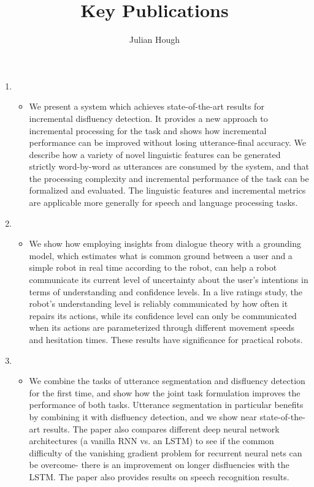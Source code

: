 \documentclass[12pt]{article}
\title{Key Publications}
\author{Julian Hough}
\begin{document}
\maketitle


\begin{enumerate}
\item{}
\begin{itemize}
\item[] We present a system which achieves state-of-the-art results for incremental disfluency detection. It provides a new approach to incremental processing for the task and shows how incremental performance can be improved without losing utterance-final accuracy. We describe how a variety of novel linguistic features can be generated strictly word-by-word as utterances are consumed by the system, and that the processing complexity and incremental performance of the task can be formalized and evaluated. The linguistic features and incremental metrics are applicable more generally for speech and language processing tasks.
\end{itemize}

\item{}\begin{itemize}
\item[] We show how employing insights from dialogue theory with a grounding model, which estimates what is common ground between a user and a simple robot in real time according to the robot, can help a robot communicate its current level of uncertainty about the user's intentions in terms of understanding and confidence levels. In a live ratings study, the robot's understanding level is reliably communicated by how often it repairs its actions, while its confidence level can only be communicated when its actions are parameterized through different movement speeds and hesitation times. These results have significance for practical robots.
\end{itemize}

\item{}\begin{itemize}
\item[] We combine the tasks of utterance segmentation and disfluency detection for the first time, and show how the joint task formulation improves the performance of both tasks. Utterance segmentation in particular benefits by combining it with disfluency detection, and we show near state-of-the-art results. The paper also compares different deep neural network architectures (a vanilla RNN vs. an  LSTM) to see if the common difficulty of the vanishing gradient problem for recurrent neural nets can be overcome- there is an improvement on longer disfluencies with the LSTM. The paper also provides results on speech recognition results.
\end{itemize}


\end{enumerate}
\end{document}

